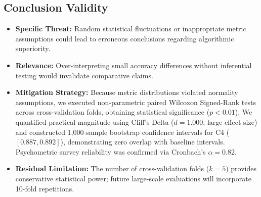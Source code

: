 \documentclass[a4paper,fleqn]{cas-dc}
\begin{document}
\subsection{Conclusion Validity}
\begin{itemize}
    \item \textbf{Specific Threat:} Random statistical fluctuations or inappropriate metric assumptions could lead to erroneous conclusions regarding algorithmic superiority.
    \item \textbf{Relevance:} Over-interpreting small accuracy differences without inferential testing would invalidate comparative claims.
    \item \textbf{Mitigation Strategy:} Because metric distributions violated normality assumptions, we executed non-parametric paired Wilcoxon Signed-Rank tests across cross-validation folds, obtaining statistical significance ($p < 0.01$). We quantified practical magnitude using Cliff's Delta ($d = 1.000$, large effect size) and constructed 1,000-sample bootstrap confidence intervals for C4 ($[0.887, 0.892]$), demonstrating zero overlap with baseline intervals. Psychometric survey reliability was confirmed via Cronbach's $\alpha = 0.82$.
    \item \textbf{Residual Limitation:} The number of cross-validation folds ($k = 5$) provides conservative statistical power; future large-scale evaluations will incorporate 10-fold repetitions.
\end{itemize}
\end{document}
